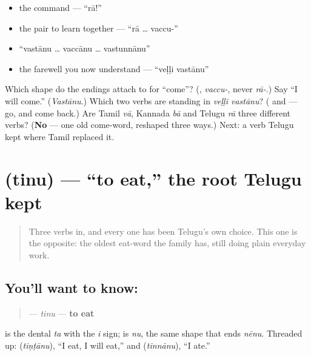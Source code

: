 \begin{itemize}
\raggedright
  \item the command — \textquotedblleft{}rā!\textquotedblright{}
  \item the pair to learn together — \textquotedblleft{}rā … vaccu-\textquotedblright{}
  \item \textquotedblleft{}vastānu … vaccānu … vastunnānu\textquotedblright{}
  \item the farewell you now understand — \textquotedblleft{}veḷḷi vastānu\textquotedblright{}
\end{itemize}

\begin{tcolorbox}[breakable,colback=teal!4,colframe=teal!35!black,title={Before you move on}]
Which shape do the endings attach to for \textquotedblleft{}come\textquotedblright{}? (\textbf{}, \emph{vaccu-}, never \emph{rā-}.) Say \textquotedblleft{}I will come.\textquotedblright{} (\emph{Vastānu}.) Which two verbs are standing in \emph{veḷḷi vastānu}? (\textbf{} and \textbf{} — go, and come back.) Are Tamil \emph{vā}, Kannada \emph{bā} and Telugu \emph{rā} three different verbs? (\textbf{No} — one old come-word, reshaped three ways.) Next: a verb Telugu kept where Tamil replaced it.
\end{tcolorbox}
\section[\texorpdfstring{\te{తిను} (tinu)}{తిను (tinu)}]{ (tinu) — \textquotedblleft{}to eat,\textquotedblright{} the root Telugu kept}

\label{lesson:TE-C32-tinu}



\begin{quote}
Three verbs in, and every one has been Telugu's own choice. This one is the opposite: the oldest eat-word the family has, still doing plain everyday work.
\end{quote}

\subsection*{You'll want to know: }
\begin{quote}
\textbf{} — \emph{tinu} — \textbf{to eat}
\end{quote}

\textbf{} is the dental \emph{ta} with the \emph{i} sign; \textbf{} is \emph{nu}, the same shape that ends \emph{nēnu}. Threaded up: \textbf{} (\emph{tiṇṭānu}), \textquotedblleft{}I eat, I will eat,\textquotedblright{} and \textbf{} (\emph{tinnānu}), \textquotedblleft{}I ate.\textquotedblright{}

